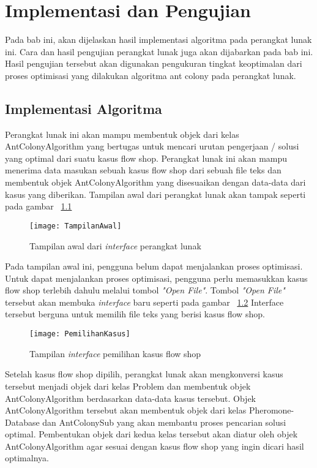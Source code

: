 \chapter{Implementasi dan Pengujian}
\label{chap:implementasi}

Pada bab ini, akan dijelaskan hasil implementasi algoritma pada perangkat lunak ini. Cara dan
hasil pengujian perangkat lunak juga akan dijabarkan pada bab ini. Hasil pengujian tersebut akan
digunakan pengukuran tingkat keoptimalan dari proses optimisasi yang dilakukan algoritma ant
colony pada perangkat lunak.

\section{Implementasi Algoritma}

Perangkat lunak ini akan mampu membentuk objek dari kelas AntColonyAlgorithm yang bertugas
untuk mencari urutan pengerjaan / solusi yang optimal dari suatu kasus flow shop. Perangkat
lunak ini akan mampu menerima data masukan sebuah kasus flow shop dari sebuah file teks
dan membentuk objek AntColonyAlgorithm yang disesuaikan dengan data-data dari kasus yang
diberikan. Tampilan awal dari perangkat lunak akan tampak seperti pada gambar ~\ref{fig:tampilanawal}

\begin{figure}[H]
	\centering
	\texttt{[image: TampilanAwal]}
	\caption[Tampilan awal dari \textit{interface} perangkat lunak]{Tampilan awal dari \textit{interface} perangkat lunak}
	\label{fig:tampilanawal}
\end{figure}

Pada tampilan awal ini, pengguna belum dapat menjalankan proses optimisasi. Untuk dapat
menjalankan proses optimisasi, pengguna perlu memasukkan kasus flow shop terlebih dahulu
melalui tombol { \it "Open File"}. Tombol { \it "Open File"} tersebut akan membuka \textit{interface} baru seperti pada
gambar ~\ref{fig:pemilihankasus} Interface tersebut berguna untuk memilih file teks yang berisi kasus flow shop.

\begin{figure}[H]
	\centering
	\texttt{[image: PemilihanKasus]}
	\caption[Tampilan \textit{interface} pemilihan kasus flow shop]{Tampilan \textit{interface} pemilihan kasus flow shop}
	\label{fig:pemilihankasus}
\end{figure}

Setelah kasus flow shop dipilih, perangkat lunak akan mengkonversi kasus tersebut menjadi
objek dari kelas Problem dan membentuk objek AntColonyAlgorithm berdasarkan data-data
kasus tersebut. Objek AntColonyAlgorithm tersebut akan membentuk objek dari kelas Pheromone-
Database dan AntColonySub yang akan membantu proses pencarian solusi optimal. Pembentukan
objek dari kedua kelas tersebut akan diatur oleh objek AntColonyAlgorithm agar sesuai dengan
kasus flow shop yang ingin dicari hasil optimalnya.

